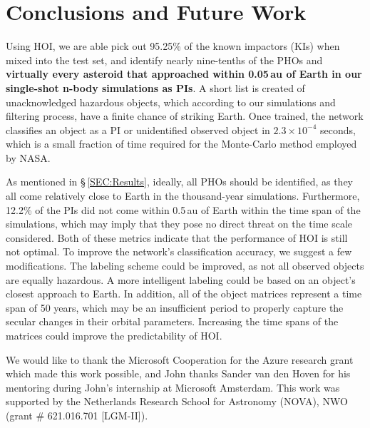 \documentclass{aa}
\begin{document}
\section{Conclusions and Future Work}
\label{SEC:Conclusions}
Using HOI, we are able pick out 95.25\% of the known impactors (KIs) when mixed into the test set, and identify nearly nine-tenths of the PHOs and \textbf{virtually every asteroid that approached within 0.05\,au of Earth in our single-shot n-body simulations as PIs}. A short list is created of unacknowledged hazardous objects, which according to our simulations and filtering process, have a finite chance of striking Earth. Once trained, the network classifies an object as a PI or unidentified observed object in $2.3\times 10^{-4}$ seconds, which is a small fraction of time required for the Monte-Carlo method employed by NASA. 
 
 As mentioned in \S\,\ref{SEC:Results}, ideally, all PHOs should be identified, as they all come relatively close to Earth in the thousand-year simulations. Furthermore, 12.2\% of the PIs did not come within 0.5\,au of Earth within the time span of the simulations, which may imply that they pose no direct threat on the time scale considered. Both of these metrics indicate that the performance of HOI is still not optimal. To improve the network's classification accuracy, we suggest a few modifications. The labeling scheme could be improved, as not all observed objects are equally hazardous. A more intelligent labeling could be based on an object's closest approach to Earth. In addition, all of the object matrices represent a time span of 50 years, which may be an insufficient period to properly capture the secular changes in their orbital parameters. Increasing the time spans of the matrices could improve the predictability of HOI. 
\begin{acknowledgements}
We would like to thank the Microsoft Cooperation for the Azure research grant which made this work possible, and John thanks Sander van den Hoven for his mentoring during John's internship at Microsoft Amsterdam. This work was supported by the Netherlands Research School for Astronomy (NOVA), NWO (grant \# 621.016.701 [LGM-II]).

\end{acknowledgements}


\end{document}
